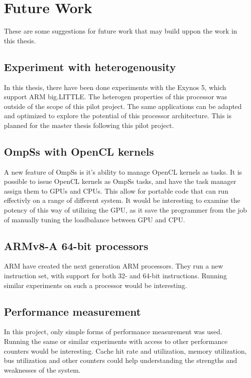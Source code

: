 \chapter[Future Work]{Future Work}
These are some suggestions for future work that may build uppon the work in this thesis.

\section{Experiment with heterogenousity}
In this thesis, there have been done experiments with the Exynos 5, which support ARM big.LITTLE.
The heterogen properties of this processor was outside of the scope of this pilot project.
The same applications can be adapted and optimized to explore the potential of this processor architecture.
This is planned for the master thesis following this pilot project.

\section{OmpSs with OpenCL kernels}
A new feature of OmpSs is it's ability to manage OpenCL kernels as tasks.
It is possible to issue OpenCL kernels as OmpSs tasks, and have the task manager assign them to GPUs and CPUs.
This allow for portable code that can run effectivly on a range of different system.
It would be interesting to examine the potency of this way of utilizing the GPU, as it save the programmer from the job of manually tuning the loadbalance between GPU and CPU.

\section{ARMv8-A 64-bit processors}
ARM have created the next generation ARM processors.
They run a new instruction set, with support for both 32- and 64-bit instructions.
Running similar experiments on such a processor would be interesting.

\section{Performance measurement}
In this project, only simple forms of performance measurement was used.
Running the same or similar experiments with access to other performance counters would be interesting.
Cache hit rate and utilization, memory utilization, bus utilization and other counters could help understanding the strengths and weaknesses of the system.

